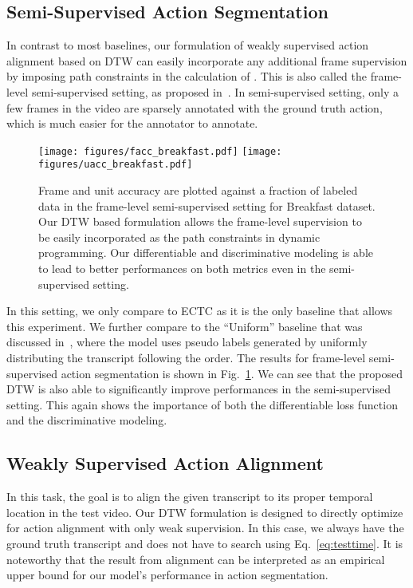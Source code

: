 \documentclass[10pt,twocolumn,letterpaper]{article}
\newcommand{\dttw}{DTW\xspace}
\newcommand{\eqnref}[1]{{Eq.\ \eqref{eq:#1}}}
\begin{document}
\subsection{Semi-Supervised Action Segmentation}

In contrast to most baselines, our formulation of weakly supervised action alignment based on DTW can easily incorporate any additional frame supervision by imposing path constraints in the calculation of . This is also called the frame-level semi-supervised setting, as proposed in~\cite{huang2016connectionist}. In semi-supervised setting, only a few frames in the video are sparsely annotated with the ground truth action, which is much easier for the annotator to annotate.

\begin{figure}[tb]
\centering
\texttt{[image: figures/facc\_breakfast.pdf]}
\texttt{[image: figures/uacc\_breakfast.pdf]}
\vspace{-2mm}
\caption{ Frame and unit accuracy are plotted against a fraction of labeled data in the frame-level semi-supervised setting for Breakfast dataset. Our DTW based formulation allows the frame-level supervision to be easily incorporated as the path constraints in dynamic programming. Our differentiable and discriminative modeling is able to lead to better performances on both metrics even in the semi-supervised setting.
}
\vspace{-3mm}
\label{fig:semi}
\end{figure}

In this setting, we only compare to ECTC as it is the only baseline that allows this experiment. We further compare to the ``Uniform'' baseline that was discussed in~\cite{huang2016connectionist}, where the model uses pseudo labels generated by uniformly distributing the transcript following the order. The results for frame-level semi-supervised action segmentation is shown in  Fig.~\ref{fig:semi}. We can see that the proposed \dttw is also able to  significantly improve performances in the semi-supervised setting. This again shows the importance of both the differentiable loss function and the discriminative modeling.




\subsection{Weakly Supervised Action Alignment}

In this task, the goal is to align the given transcript to its proper temporal location in the test video. Our \dttw formulation is designed to directly optimize for action alignment with only weak supervision. In this case, we always have the ground truth transcript  and does not have to search using \eqnref{testtime}. It is noteworthy that the result from alignment can be interpreted as an empirical upper bound for our model's performance in action segmentation. 
\end{document}
